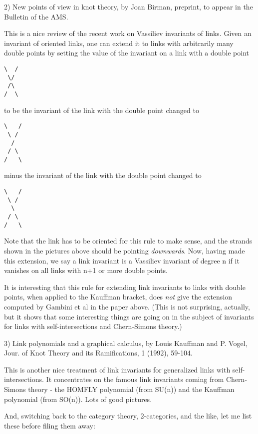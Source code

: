 2)  New points of view in knot theory, by Joan Birman, preprint, to
appear in the Bulletin of the AMS.

This is a nice review of the recent work on Vassiliev invariants
of links.  Given an invariant of oriented links, one can extend
it to links with arbitrarily many double points by setting
the value of the invariant on a link with a double point

\begin{verbatim}
\  /
 \/
 /\
/  \
\end{verbatim}
    
to be the invariant of the link with the double point changed to

\begin{verbatim}
\   /
 \ /
  /
 / \
/   \
\end{verbatim}
    
minus the invariant of the link with the double point changed to

\begin{verbatim}
\   /
 \ /
  \
 / \
/   \
\end{verbatim}
    
Note that the link has to be oriented for this rule to make sense,
and the strands shown in the pictures above should be pointing
\emph{downwards}.   Now, having made this extension, we say a link
invariant is a Vassiliev invariant of degree n if it vanishes
on all links with n+1 or more double points.  

It is interesting that this rule for extending link invariants
to links with double points, when applied to the Kauffman bracket,
does \emph{not} give the extension computed by Gambini et al in the paper
above.  (This is not surprising, actually, but it shows that some
interesting things are going on in the subject of invariants for
links with self-intersections and Chern-Simons theory.)  

3)  Link polynomials and a graphical calculus, by Louis Kauffman and
P. Vogel, Jour. of Knot Theory and its Ramifications, 1 (1992), 59-104.

This is another nice treatment of link invariants for generalized
links with self-intersections.  It concentrates on the famous
link invariants coming from Chern-Simons theory - the HOMFLY
polynomial (from SU(n)) and the Kauffman polynomial (from SO(n)).
Lots of good pictures.

And, switching back to the category theory, 2-categories, and the like,
let me list these before filing them away:

